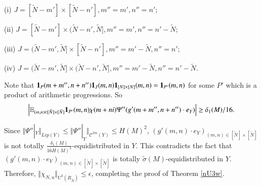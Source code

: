 \documentclass[12pt,amstex]{amsart}
\theoremstyle{definition}
\def \d {\delta}
\def \e {\epsilon}
\def \R {R_{\tilde{N}}}
\begin{document}
  (i) $J=[\tilde{N}-m']\times[\tilde{N}-n'], m''=m', n''=n'$;

  (ii) $J=[\tilde{N}-m']\times(\tilde{N}-n',\tilde{N}], m''=m', n''=n'-\tilde{N}$;

  (iii) $J=(\tilde{N}-m',\tilde{N}]\times[\tilde{N}-n'], m''=m'-\tilde{N}, n''=n'$;

  (iv) $J=(\tilde{N}-m',\tilde{N}]\times(\tilde{N}-n',\tilde{N}], m''=m'-\tilde{N}, n''=n'-\tilde{N}$.

  Note that $\bold{1}_{P}(m+m'',n+n'')\bold{1}_{J}(m,n)\bold{1}_{[N]\times[N]}(m,n)=\bold{1}_{P'}(m,n)$ for some $P'$ which is a product of arithmetic progressions. So
    \begin{equation}\nonumber
   \begin{split}
   \Bigl\vert\mathbb{E}_{(m,n)\in [\tilde{N}]\times[\tilde{N}]}\bold{1}_{P'}(m,n)\chi(m+ni)\Psi''(g'(m+m'',n+n'')\cdot e_{Y})\Bigr\vert\geq\d_{1}(M)/16.
  \end{split}
  \end{equation}

Since $\Vert\Psi''|_{Y}\Vert_{Lip(Y)}\leq\Vert\Psi''|_{Y}\Vert_{\mathcal{C}^{2m}(Y)}\leq H(M)^{2}$,
$(g'(m,n)\cdot e_{Y})_{(m,n)\in[\tilde{N}]\times[\tilde{N}]}$ is not totally $\frac{\d_{1}(M)}{16H(M)^{2}}$-equidistributed in $Y$.
This contradicts the fact that $(g'(m,n)\cdot e_{Y})_{(m,n)\in[\tilde{N}]\times[\tilde{N}]}$ is totally $\tilde{\sigma}(M)$-equidistributed in $Y$. Therefore, $\Vert\chi_{N,u}\Vert_{U^{3}(\R)}\leq\e$, completing the proof of Theorem \ref{nU3w}.
\end{document}
